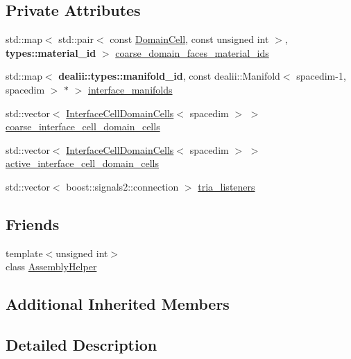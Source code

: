 \subsection*{Private Attributes}
\begin{DoxyCompactItemize}
\item 
std\+::map$<$ std\+::pair$<$ const \hyperlink{class_triangulation_system_af53de5ec80a16d9cb167660b2832b240}{Domain\+Cell}, const unsigned int $>$, {\bf types\+::material\+\_\+id} $>$ \hyperlink{class_triangulation_system_a9a14a8a68bda679330a169413f0e2dfb}{coarse\+\_\+domain\+\_\+faces\+\_\+material\+\_\+ids}
\item 
std\+::map$<$ {\bf dealii\+::types\+::manifold\+\_\+id}, const dealii\+::\+Manifold$<$ spacedim-\/1, spacedim $>$ $\ast$ $>$ \hyperlink{class_triangulation_system_a130322b74b66f27d8611ce92ad241c6d}{interface\+\_\+manifolds}
\item 
std\+::vector$<$ \hyperlink{class_interface_cell_domain_cells}{Interface\+Cell\+Domain\+Cells}$<$ spacedim $>$ $>$ \hyperlink{class_triangulation_system_a5b909c472fe2508da44e89b017aa146c}{coarse\+\_\+interface\+\_\+cell\+\_\+domain\+\_\+cells}
\item 
std\+::vector$<$ \hyperlink{class_interface_cell_domain_cells}{Interface\+Cell\+Domain\+Cells}$<$ spacedim $>$ $>$ \hyperlink{class_triangulation_system_a516c7a253cefbc5e208714538b21424d}{active\+\_\+interface\+\_\+cell\+\_\+domain\+\_\+cells}
\item 
std\+::vector$<$ boost\+::signals2\+::connection $>$ \hyperlink{class_triangulation_system_a713f97bee5570de1f5571d86a41e83f6}{tria\+\_\+listeners}
\end{DoxyCompactItemize}
\subsection*{Friends}
\begin{DoxyCompactItemize}
\item 
{\footnotesize template$<$unsigned int$>$ }\\class \hyperlink{class_triangulation_system_af4019c2e39cc934d646aaa35c3c52773}{Assembly\+Helper}
\end{DoxyCompactItemize}
\subsection*{Additional Inherited Members}


\subsection{Detailed Description}
